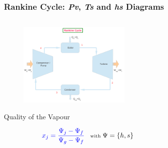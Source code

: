 \documentclass[10pt,compress]{beamer}
\newcommand{\frc}{\displaystyle\frac}
\newcommand{\blue}{\textcolor{blue}}
\begin{document}
\begin{frame}
 \frametitle{Rankine Cycle: {\it Pv}, {\it Ts} and {\it hs} Diagrams}
 \begin{columns}
%
   \begin{column}[l]{0.45\linewidth}
    \begin{figure}%
     \begin{center}
      \includegraphics[width=5.5cm,clip]{./Pics/Simple_Rankine_Cycle}
     \end{center}
    \end{figure} 
    \begin{block}{\begin{center}Quality of the Vapour\end{center}}
       \begin{equation}\scriptsize
         \blue{x_{j} = \frc{\Psi_{j}-\Psi_{f}}{\Psi_{g}-\Psi_{f}}} \;\;\;\text{with }\Psi=\left\{h,s\right\}
       \end{equation}
    \end{block}
   \end{column}
%
   \begin{column}[c]{0.55\linewidth}
    \begin{figure}%
     \begin{center}
     \end{center}
    \end{figure}  
   \end{column}
  \end{columns}
\end{frame}
\end{document}
